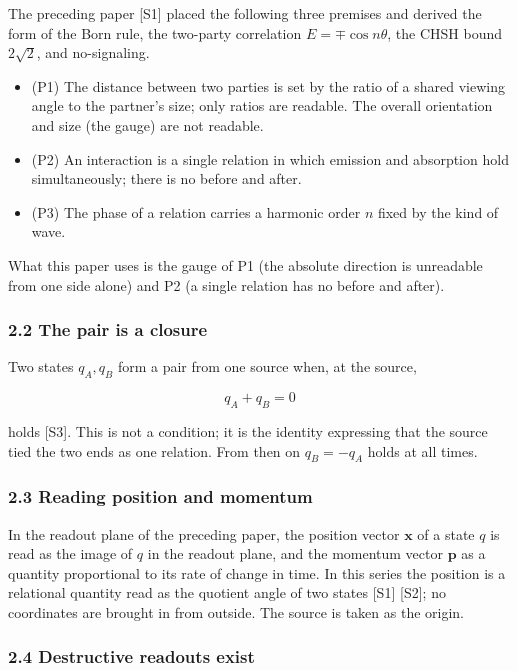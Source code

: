 \documentclass[
  a4paper,
]{article}
\providecommand{\tightlist}{%
  \setlength{\itemsep}{0pt}\setlength{\parskip}{0pt}}
\begin{document}
The preceding paper {[}S1{]} placed the following three premises and
derived the form of the Born rule, the two-party correlation
\(E=\mp\cos n\theta\), the CHSH bound \(2\sqrt2\), and no-signaling.

\begin{itemize}
\tightlist
\item
  (P1) The distance between two parties is set by the ratio of a shared
  viewing angle to the partner's size; only ratios are readable. The
  overall orientation and size (the gauge) are not readable.
\item
  (P2) An interaction is a single relation in which emission and
  absorption hold simultaneously; there is no before and after.
\item
  (P3) The phase of a relation carries a harmonic order \(n\) fixed by
  the kind of wave.
\end{itemize}

What this paper uses is the gauge of P1 (the absolute direction is
unreadable from one side alone) and P2 (a single relation has no before
and after).

\subsubsection{2.2 The pair is a closure}\label{the-pair-is-a-closure}

Two states \(q_A, q_B\) form a pair from one source when, at the source,

\[
q_A+q_B=0
\]

holds {[}S3{]}. This is not a condition; it is the identity expressing
that the source tied the two ends as one relation. From then on
\(q_B=-q_A\) holds at all times.

\subsubsection{2.3 Reading position and
momentum}\label{reading-position-and-momentum}

In the readout plane of the preceding paper, the position vector
\(\boldsymbol{x}\) of a state \(q\) is read as the image of \(q\) in the
readout plane, and the momentum vector \(\boldsymbol{p}\) as a quantity
proportional to its rate of change in time. In this series the position
is a relational quantity read as the quotient angle of two states
{[}S1{]} {[}S2{]}; no coordinates are brought in from outside. The
source is taken as the origin.

\subsubsection{2.4 Destructive readouts
exist}\label{destructive-readouts-exist}
\end{document}
